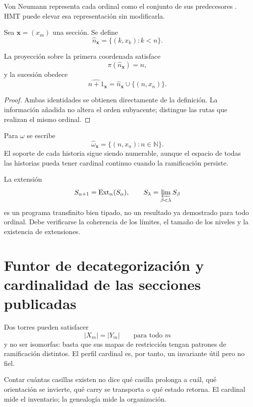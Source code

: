 Von Neumann representa cada ordinal como el conjunto de sus predecesores
\citep{vonneumann1923}. HMT puede elevar esa representación sin modificarla.

\begin{definition}
Sea \(\boldsymbol x=(x_m)\) una sección. Se define
\[
  \widehat n_{\boldsymbol x}
  =
  \{(k,x_k):k<n\}.
\]
\end{definition}

\begin{proposition}
La proyección sobre la primera coordenada satisface
\[
  \pi(\widehat n_{\boldsymbol x})=n,
\]
y la sucesión obedece
\[
  \widehat{n+1}_{\boldsymbol x}
  =
  \widehat n_{\boldsymbol x}\cup\{(n,x_n)\}.
\]
\end{proposition}

\begin{proof}
Ambas identidades se obtienen directamente de la definición. La información
añadida no altera el orden subyacente; distingue las rutas que realizan el
mismo ordinal.
\end{proof}

Para \(\omega\) se escribe
\[
  \widehat\omega_{\boldsymbol x}
  =
  \{(n,x_n):n\in\mathbb N\}.
\]
El soporte de cada historia sigue siendo numerable, aunque el espacio de
todas las historias pueda tener cardinal continuo cuando la ramificación
persiste.

\begin{remark}
La extensión
\[
S_{\alpha+1}=\operatorname{Ext}_\alpha(S_\alpha),
\qquad
S_\lambda=\varprojlim_{\beta<\lambda}S_\beta
\]
es un programa transfinito bien tipado, no un resultado ya demostrado para
todo ordinal. Debe verificarse la coherencia de los límites, el tamaño de los
niveles y la existencia de extensiones.
\end{remark}

\section{Funtor de decategorización y cardinalidad de las secciones publicadas}

Dos torres pueden satisfacer
\[
  |X_m|=|Y_m|\qquad\text{para todo }m
\]
y no ser isomorfas: basta que sus mapas de restricción tengan patrones de
ramificación distintos. El perfil cardinal es, por tanto, un invariante
útil pero no fiel.

\begin{remark}
Contar cuántas casillas existen no dice qué casilla prolonga a cuál, qué
orientación se invierte, qué carry se transporta o qué estado retorna. El
cardinal mide el inventario; la genealogía mide la organización.
\end{remark}


